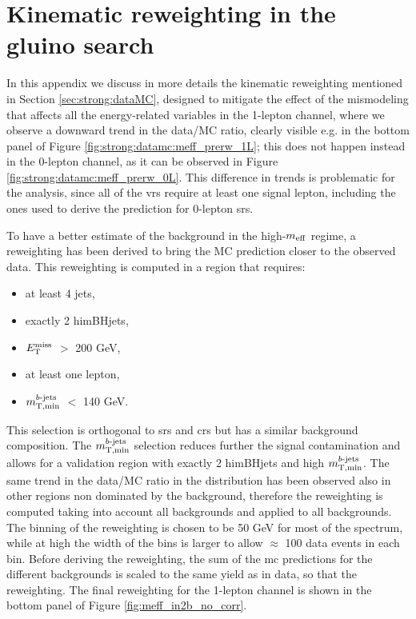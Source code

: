 \chapter{Kinematic reweighting in the gluino search}
\label{app:meffrw}

In this appendix we discuss in more details the kinematic reweighting mentioned in Section \ref{sec:strong:dataMC},
designed to mitigate the effect of the mismodeling that affects all the energy-related variables in the 1-lepton channel,
where we observe a downward trend in the data/MC ratio, clearly visible e.g. in the bottom panel of 
Figure \ref{fig:strong:datamc:meff_prerw_1L}; 
this does not happen instead in the 0-lepton channel, as it can be observed in 
Figure \ref{fig:strong:datamc:meff_prerw_0L}.
This difference in trends is problematic for the analysis, since all of the \glspl{vr} require at least one signal lepton, 
including the ones used to derive the prediction for 0-lepton \glspl{sr}.

To have a better estimate of the background in the high-$m_{\mathrm{eff}}$ regime, a reweighting has been derived to bring the MC prediction closer to the observed data. This reweighting is computed in a region that requires:
\begin{itemize}
\item at least 4 jets,
\item exactly 2 himBHjets,
\item $E_{\rm T}^{\mathrm{miss}}$ $>$ 200 GeV,
\item at least one lepton,
\item $m_{\mathrm{T, min}}^{b\textrm{-jets}}$ $<$ 140 GeV.
\end{itemize}

This selection is orthogonal to \glspl{sr} and \glspl{cr} but has a similar background composition. 
The $m_{\mathrm{T, min}}^{b\textrm{-jets}}$ selection reduces further the signal contamination and allows for a validation region with exactly 2 himBHjets and high $m_{\mathrm{T, min}}^{b\textrm{-jets}}$. 
The same trend in the data/MC ratio in the \meff distribution has been observed also in other regions non dominated by the 
\ttbar background,
therefore the reweighting is computed taking into account all backgrounds and applied to all backgrounds. 
The binning of the reweighting is chosen to be 50 GeV for most of the \meff spectrum, 
while at high \meff the width of the bins is larger to allow $\approx$ 100 data events in each bin. 
Before deriving the reweighting, the sum of the \gls{mc} predictions for the different backgrounds is scaled to the same yield as in data,
so that the reweighting.
The final reweighting for the 1-lepton channel is shown in the bottom panel of Figure \ref{fig:meff_in2b_no_corr}.

